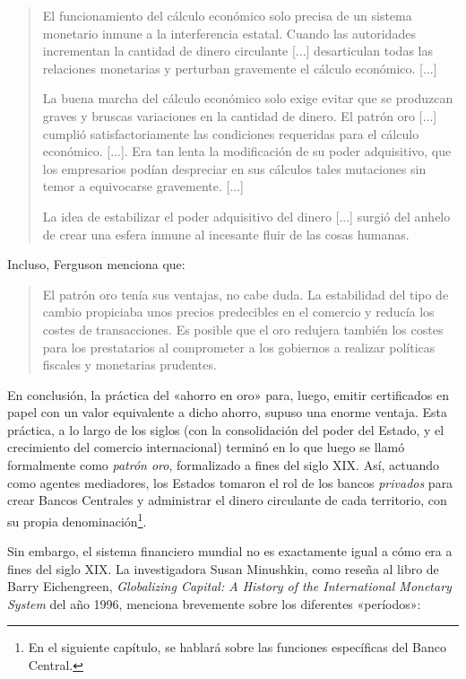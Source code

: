 \documentclass[12pt,a4paper,twoside]{book}
\begin{document}
\begin{quotation}
El funcionamiento del cálculo económico solo precisa de un sistema monetario inmune a la interferencia estatal. Cuando las autoridades incrementan la cantidad de dinero circulante [...] desarticulan todas las relaciones monetarias y perturban gravemente el cálculo económico. [...]

La buena marcha del cálculo económico solo exige evitar que se produzcan graves y bruscas variaciones en la cantidad de dinero. El patrón oro [...] cumplió satisfactoriamente las condiciones requeridas para el cálculo económico. [...]. Era tan lenta la modificación de su poder adquisitivo, que los empresarios podían despreciar en sus cálculos tales mutaciones sin temor a equivocarse gravemente. [...]

La idea de estabilizar el poder adquisitivo del dinero [...] surgió del anhelo de crear una esfera inmune al incesante fluir de las cosas humanas.	\cite[págs. 271-272]{mises:lah}
\end{quotation}

Incluso, Ferguson menciona que:

\begin{quotation}
El patrón oro tenía sus ventajas, no cabe duda. La estabilidad del tipo de cambio propiciaba unos precios predecibles en el comercio y reducía los costes de transacciones. Es posible que el oro redujera también los costes para los prestatarios al comprometer a los gobiernos a realizar políticas fiscales y monetarias prudentes. \cite[págs. 75-76]{triunfo-dinero}
\end{quotation}

En conclusión, la práctica del «ahorro en oro» para, luego, emitir certificados en papel con un valor equivalente a dicho ahorro, supuso una enorme ventaja. Esta práctica, a lo largo de los siglos (con la consolidación del poder del Estado, y el crecimiento del comercio internacional) terminó en lo que luego se llamó formalmente como \textit{patrón oro}, formalizado a fines del siglo XIX. Así, actuando como agentes mediadores, los Estados tomaron el rol de los bancos \textit{privados} para crear Bancos Centrales y administrar el dinero circulante de cada territorio, con su propia denominación\footnote{En el siguiente capítulo, se hablará sobre las funciones específicas del Banco Central.}.

Sin embargo, el sistema financiero mundial no es exactamente igual a cómo era a fines del siglo XIX. La investigadora Susan Minushkin, como reseña al libro de Barry Eichengreen, \textit{Globalizing Capital: A History of the International Monetary System} del año 1996, menciona brevemente sobre los diferentes «períodos»:
\end{document}
